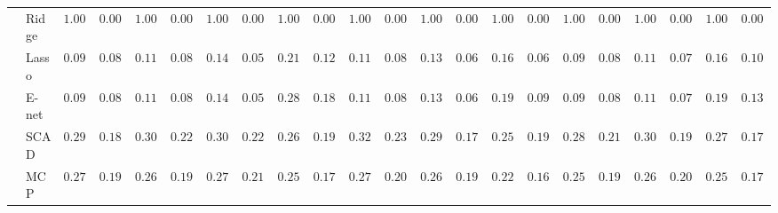 \begin{tabular}{ll|ll|llllll|llllll|llllll}
 & Ridge  & $1.0000$ & $0.0000$ & $1.0000$ & $0.0000$ & $1.0000$ & $0.0000$ & $1.0000$ & $0.0000$ & $1.0000$ & $0.0000$ & $1.0000$ & $0.0000$ & $1.0000$ & $0.0000$ & $1.0000$ & $0.0000$ & $1.0000$ & $0.0000$ & $1.0000$ & $0.0000$ \\
 & Lasso  & $0.0933$ & $0.0831$ & $0.1133$ & $0.0850$ & $0.1467$ & $0.0544$ & $0.2117$ & $0.1205$ & $0.1167$ & $0.0803$ & $0.1350$ & $0.0657$ & $0.1650$ & $0.0690$ & $0.0983$ & $0.0824$ & $0.1167$ & $0.0768$ & $0.1667$ & $0.1059$ \\
 & E-net  & $0.0933$ & $0.0831$ & $0.1167$ & $0.0870$ & $0.1483$ & $0.0575$ & $0.2800$ & $0.1848$ & $0.1167$ & $0.0803$ & $0.1367$ & $0.0686$ & $0.1917$ & $0.0959$ & $0.0983$ & $0.0824$ & $0.1167$ & $0.0768$ & $0.1933$ & $0.1396$ \\
 & SCAD  & $0.2900$ & $0.1889$ & $0.3083$ & $0.2277$ & $0.3017$ & $0.2231$ & $0.2617$ & $0.1943$ & $0.3233$ & $0.2343$ & $0.2967$ & $0.1798$ & $0.2517$ & $0.1932$ & $0.2850$ & $0.2123$ & $0.3000$ & $0.1953$ & $0.2700$ & $0.1753$ \\
 & MCP  & $0.2750$ & $0.1973$ & $0.2633$ & $0.1985$ & $0.2700$ & $0.2116$ & $0.2567$ & $0.1795$ & $0.2783$ & $0.2052$ & $0.2633$ & $0.1927$ & $0.2283$ & $0.1601$ & $0.2567$ & $0.1988$ & $0.2683$ & $0.2023$ & $0.2517$ & $0.1716$ \\
\hline 
\end{tabular}

